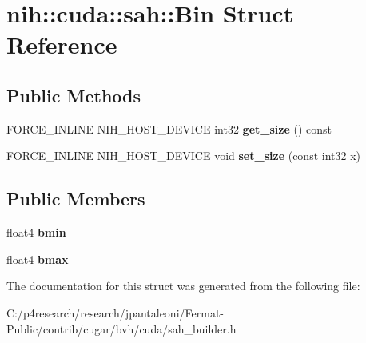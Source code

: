\hypertarget{structnih_1_1cuda_1_1sah_1_1_bin}{}\section{nih\+:\+:cuda\+:\+:sah\+:\+:Bin Struct Reference}
\label{structnih_1_1cuda_1_1sah_1_1_bin}
\subsection*{Public Methods}
\begin{DoxyCompactItemize}
\item 
\mbox{\label{structnih_1_1cuda_1_1sah_1_1_bin_a110725c22ec67d37d76ae050def83ef4}} 
F\+O\+R\+C\+E\+\_\+\+I\+N\+L\+I\+NE N\+I\+H\+\_\+\+H\+O\+S\+T\+\_\+\+D\+E\+V\+I\+CE int32 {\bfseries get\+\_\+size} () const
\item 
\mbox{\label{structnih_1_1cuda_1_1sah_1_1_bin_ac5a3567f77045dd99027256a9b1e157a}} 
F\+O\+R\+C\+E\+\_\+\+I\+N\+L\+I\+NE N\+I\+H\+\_\+\+H\+O\+S\+T\+\_\+\+D\+E\+V\+I\+CE void {\bfseries set\+\_\+size} (const int32 x)
\end{DoxyCompactItemize}
\subsection*{Public Members}
\begin{DoxyCompactItemize}
\item 
\mbox{\label{structnih_1_1cuda_1_1sah_1_1_bin_a813bd78869dbaca446fc674e1b4a2372}} 
float4 {\bfseries bmin}
\item 
\mbox{\label{structnih_1_1cuda_1_1sah_1_1_bin_ac7d0ca8b94ca9fda5f46f50ecf006ce7}} 
float4 {\bfseries bmax}
\end{DoxyCompactItemize}


The documentation for this struct was generated from the following file\+:\begin{DoxyCompactItemize}
\item 
C\+:/p4research/research/jpantaleoni/\+Fermat-\/\+Public/contrib/cugar/bvh/cuda/sah\+\_\+builder.\+h\end{DoxyCompactItemize}
